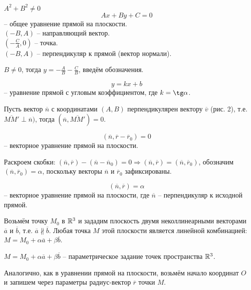 	\begin{Def}
		$A^2 + B^2 \neq 0$
		$$Ax + By + C = 0$$ -- общее уравнение прямой на плоскости. \\
		$(-B, A)$ -- направляющий вектор.\\
		$(-\frac{C}{A}, 0)$ -- точка.\\
		$(-B, A)$ -- перпендикуляр к прямой (вектор нормали). 
	\end{Def}

	$B \neq 0$, тогда $y = -\frac{A}{B} - \frac{C}{B}$, введём обозначения.
	\begin{Def}
		$$y = kx + b$$ -- уравнение прямой с угловым коэффициентом, где $k = \tg \alpha$.
	\end{Def}

	Пусть вектор $\overline{n}$ с координатами $(A,B)$ перпендикулярен вектору  $\overline{v}$ (рис. 2), т.е. $\overline{MM'} \perp \overline{n})$, тогда $(\overline{n}, \overline{MM'}) = 0$.

	\begin{Def}
		$$(\overline{n}, \overline{r} - \overline{r}_0) = 0$$ -- векторное уравнение прямой на плоскости.
	\end{Def}

	Раскроем скобки: $(\overline{n}, \overline{r}) - (\overline{n} - \overline{n}_0) = 0 \Rightarrow (\overline{n}, \overline{r}) = (\overline{n}, \overline{r}_0)$, обозначим $(\overline{n}, \overline{r}_0) = \alpha$, поскольку векторы $\overline{n}$ и $\overline{r}_0$ зафиксированы.

	\begin{Def}
		$$(\overline{n}, \overline{r}) = \alpha$$ -- векторное уравнение прямой на плоскости, где $\overline{n}$ -- перпендикуляр к исходной прямой.
	\end{Def}

	
	Возьмём точку $M_0$ в $\mathbb{R}^3$ и зададим плоскость двумя неколлинеарными векторами $\overline{a}$ и $\overline{b}$, т.е. $\overline{a} \nparallel \overline{b}$. Любая точка $M$ этой плоскости является линейной комбинацией: $M = M_0 + \alpha \overline{a} + \beta \overline{b}$.
	
	\begin{Def}
		$M = M_0 + \alpha \overline{a}  + \beta \overline{b}$ -- параметрическое задание точек пространства $\mathbb{R}^3$.
	\end{Def}
	
	Аналогично, как в уравнении прямой на плоскости, возьмём начало координат $O$ и запишем через параметры радиус-вектор $\overline{r}$ точки $M$.


